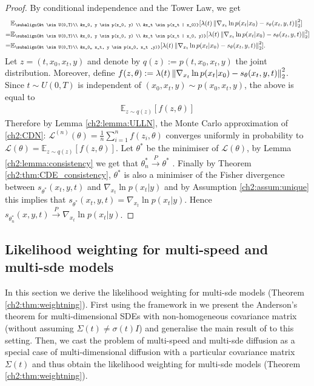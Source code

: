 \begin{proof}
    By conditional independence and the Tower Law, we get
    \begin{align*}
         &\mathbb{E}_{\subalign{&t \sim U(0,T)\\ &x_0, y \sim p(x_0, y) \\ &x_t \sim p(x_t | x_0)}} 
                [\lambda(t) \norm{\nabla_{x_t} \ln{p(x_t | x_0)} - s_\theta(x_t, y, t)}_2^2] \\
        =& \mathbb{E}_{\subalign{&t \sim U(0,T)\\ &x_0, y \sim p(x_0, y) \\ &x_t \sim p(x_t | x_0, y)}} 
            [\lambda(t) \norm{\nabla_{x_t} \ln{p(x_t | x_0)} - s_\theta(x_t, y, t)}_2^2] \\
        =& \mathbb{E}_{\subalign{&t \sim U(0,T)\\ &x_0,, x_t, y \sim p(x_0, x_t ,y)}} 
            [\lambda(t) \norm{\nabla_{x_t} \ln{p(x_t | x_0)} - s_\theta(x_t, y, t)}_2^2].
    \end{align*}
    Let $z=(t,x_0,x_t,y)$ and denote by $q(z):=p(t,x_0,x_t,y)$ the joint distribution. Moreover, define $f(z,\theta) := \lambda(t) \left\lVert \nabla_{x_t} \ln{p(x_t | x_0)} - s_\theta(x_t, y, t) \right\rVert_2^2$. Since $t \sim U(0,T)$ is independent of $(x_0, x_t ,y) \sim p(x_0, x_t ,y)$, the above is equal to 
    \begin{align*}
        \mathbb{E}_{z \sim q(z)} 
            [f(z,\theta)]
    \end{align*}
    Therefore by Lemma \ref{ch2:lemma:ULLN}, the Monte Carlo approximation of \ref{ch2:CDN}: $\mathcal{L}^{(n)}(\theta)=\frac{1}{n}\sum_{i=1}^n f(z_i, \theta)$ converges uniformly in probability to $\mathcal{L}(\theta) = \mathbb{E}_{z \sim q(z)} 
    [f(z,\theta)]$. Let $\theta^\ast$ be the minimiser of $\mathcal{L}(\theta)$, by Lemma \ref{ch2:lemma:consistency} we get that $\theta^\ast_n \overset{P}{\to} \theta^\ast$ . Finally by Theorem \ref{ch2:thm:CDE_consistency}, $\theta^\ast$ is also a minimiser of the Fisher divergence between $s_{\theta^\ast}(x_t,y,t)$ and $\nabla_{x_t} \ln p(x_t | y)$ and by Assumption \ref{ch2:assum:unique} this implies that $s_{\theta^\ast}(x_t,y,t) = \nabla_{x_t} \ln p(x_t | y)$. Hence $s_{\theta_n^\ast}(x,y,t) \overset{P}{\to} \nabla_{x_t} \ln p(x_t | y)$.
\end{proof}

\subsection{Likelihood weighting for multi-speed and multi-sde models}
\label{ch2:appendix:weighting}
In this section we derive the likelihood weighting for multi-sde models (Theorem \ref{ch2:thm:weightning}). First using the framework in \cite[Appendix A]{song2021sde} we present the Anderson's theorem for multi-dimensional SDEs with non-homogeneous covariance matrix (without assuming $\Sigma(t) \not = \sigma(t) I$) and generalise the main result of \cite{song2021maximum} to this setting. Then, we cast the problem of multi-speed and  multi-sde diffusion as a special case of multi-dimensional diffusion with a particular covariance matrix $\Sigma(t)$ and thus obtain the likelihood weighting for multi-sde models (Theorem \ref{ch2:thm:weightning}).

